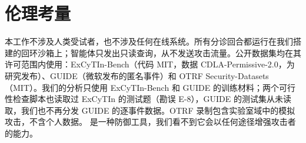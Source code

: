 \section*{伦理考量}
本工作不涉及人类受试者，也不涉及任何在线系统。所有分诊回合都运行在我们搭建的回环沙箱上；智能体只发出只读查询，从不发送攻击流量。公开数据集均在其许可范围内使用：ExCyTIn-Bench（代码 MIT，数据 CDLA-Permissive-2.0，为研究发布）、GUIDE（微软发布的匿名事件）和 OTRF Security-Datasets（MIT）。我们的分析只使用 ExCyTIn-Bench 和 GUIDE 的训练材料；两个可行性检查脚本也读取过 ExCyTIn 的测试题（勘误 E-8），GUIDE 的测试集从未读取，我们也不再分发 GUIDE 的逐事件数据。OTRF 录制包含实验室域中的模拟攻击，不含个人数据。\hesp{} 是一种防御工具，我们看不到它会以任何途径增强攻击者的能力。
